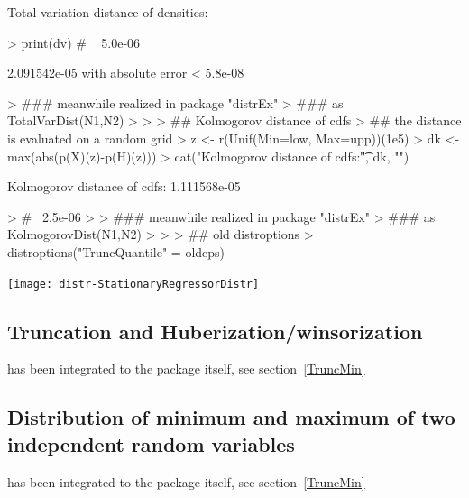 \documentclass[11pt]{article}
\begin{document}
\begin{Schunk}
\begin{Sinput}
\end{Sinput}
\begin{Soutput}
Total variation distance of densities:	
\end{Soutput}
\begin{Sinput}
> print(dv) # ~ 5.0e-06
\end{Sinput}
\begin{Soutput}
2.091542e-05 with absolute error < 5.8e-08
\end{Soutput}
\begin{Sinput}
> ### meanwhile realized in package "distrEx"
> ### as TotalVarDist(N1,N2)
>
>
> ## Kolmogorov distance of cdfs
> ## the distance is evaluated on a random grid
> z <- r(Unif(Min=low, Max=upp))(1e5)
> dk <- max(abs(p(X)(z)-p(H)(z)))
> cat("Kolmogorov distance of cdfs:\t", dk, "\n")
\end{Sinput}
\begin{Soutput}
Kolmogorov distance of cdfs:	 1.111568e-05
\end{Soutput}
\begin{Sinput}
> # ~2.5e-06
>
> ### meanwhile realized in package "distrEx"
> ### as KolmogorovDist(N1,N2)
>
>
> ## old distroptions
> distroptions("TruncQuantile" = oldeps)
\end{Sinput}
\end{Schunk}
\texttt{[image: distr-StationaryRegressorDistr]}
\subsection{Truncation and Huberization/winsorization}\label{truncex}
has been integrated to the package itself, see section~\ref{TruncMin}
\subsection{Distribution of minimum and maximum of two independent random variables}\label{minmaxex}
has been integrated to the package itself, see section~\ref{TruncMin}
\end{document}
